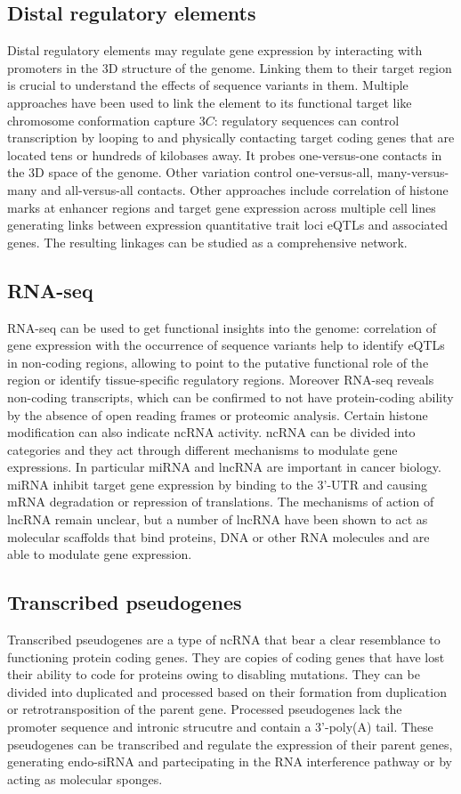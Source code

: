 	\subsection{Distal regulatory elements}
	Distal regulatory elements may regulate gene expression by interacting with promoters in the 3D structure of the genome.
	Linking them to their target region is crucial to understand the effects of sequence variants in them.
	Multiple approaches have been used to link the element to its functional target like chromosome conformation capture $3C$: regulatory sequences can control transcription by looping to and physically contacting target coding genes that are located tens or hundreds of kilobases away.
	It probes one-versus-one contacts in the 3D space of the genome.
	Other variation control one-versus-all, many-versus-many and all-versus-all contacts.
	Other approaches include correlation of histone marks at enhancer regions and target gene expression across multiple cell lines generating links between expression quantitative trait loci eQTLs and associated genes.
	The resulting linkages can be studied as a comprehensive network.

	\subsection{RNA-seq}
	RNA-seq can be used to get functional insights into the genome: correlation of gene expression with the occurrence of sequence variants help to identify eQTLs in non-coding regions, allowing to point to the putative functional role of the region or identify tissue-specific regulatory regions.
	Moreover RNA-seq reveals non-coding transcripts, which can be confirmed to not have protein-coding ability by the absence of open reading frames or proteomic analysis.
	Certain histone modification can also indicate ncRNA activity.
	ncRNA can be divided into categories and they act through different mechanisms to modulate gene expressions.
	In particular miRNA and lncRNA are important in cancer biology.
	miRNA inhibit target gene expression by binding to the 3'-UTR and causing mRNA degradation or repression of translations.
	The mechanisms of action of lncRNA remain unclear, but a number of lncRNA have been shown to act as molecular scaffolds that bind proteins, DNA or other RNA molecules and are able to modulate gene expression.

	\subsection{Transcribed pseudogenes}
	Transcribed pseudogenes are a type of ncRNA that bear a clear resemblance to functioning protein coding genes.
	They are copies of coding genes that have lost their ability to code for proteins owing to disabling mutations.
	They can be divided into duplicated and processed based on their formation from duplication or retrotransposition of the parent gene.
	Processed pseudogenes lack the promoter sequence and intronic strucutre and contain a 3'-poly(A) tail.
	These pseudogenes can be transcribed and regulate the expression of their parent genes, generating endo-siRNA and partecipating in the RNA interference pathway or by acting as molecular sponges.

